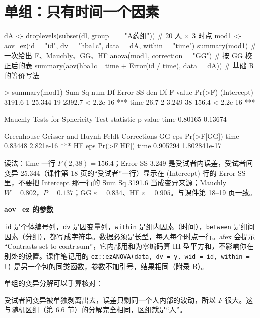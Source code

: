 \section{单组：只有时间一个因素}
\begin{rcode}[R · aov\_ez 单组]
dA <- droplevels(subset(dl, group == "A药组"))     # 20 人 × 3 时点
mod1 <- aov_ez(id = "id", dv = "hba1c", data = dA, within = "time")
summary(mod1)                                      # 一次给出 F、Mauchly、GG、HF
anova(mod1, correction = "GG")                     # 按 GG 校正后的表
summary(aov(hba1c ~ time + Error(id / time), data = dA))   # 基础 R 的等价写法
\end{rcode}
\begin{routput}
> summary(mod1)
            Sum Sq num Df Error SS den Df F value    Pr(>F)
(Intercept) 3191.6      1   25.344     19  2392.7 < 2.2e-16 ***
time          26.7      2    3.249     38   156.4 < 2.2e-16 ***

Mauchly Tests for Sphericity
     Test statistic p-value
time        0.80165 0.13674

Greenhouse-Geisser and Huynh-Feldt Corrections
      GG eps Pr(>F[GG])
time 0.83448  2.821e-16 ***
       HF eps   Pr(>F[HF])
time 0.905294 1.802841e-17
\end{routput}
读法：time 一行 $F(2,38)=156.4$；Error SS 3.249 是受试者内误差，受试者间变异 25.344（课件第 18 页的“受试者”一行）显示在 (Intercept) 行的 Error SS 里，不要把 Intercept 那一行的 Sum Sq 3191.6 当成变异来源；Mauchly $W=0.802$，$P=0.137$；GG $\varepsilon=0.834$、HF $\varepsilon=0.905$。与课件第 18–19 页一致。


\begin{studyexplain}
\textbf{aov\_ez 的参数}


\Verb|id| 是个体编号列，\Verb|dv| 是因变量列，\Verb|within| 是组内因素（时间），\Verb|between| 是组间因素（分组），都写成字符串。数据必须是长型，每人每个时点一行。afex 会提示 “Contrasts set to contr.sum”，它内部用和为零编码算 III 型平方和，不影响你在别处的设置。课件笔记用的 \Verb|ez::ezANOVA(data, dv = y, wid = id, within = t)| 是另一个包的同类函数，参数不加引号，结果相同（附录 B）。

\end{studyexplain}


单组的变异分解可以手算核对：

受试者间变异被单独剥离出去，误差只剩同一个人内部的波动，所以 $F$ 很大。这与随机区组（第 6.6 节）的分解完全相同，区组就是“人”。

